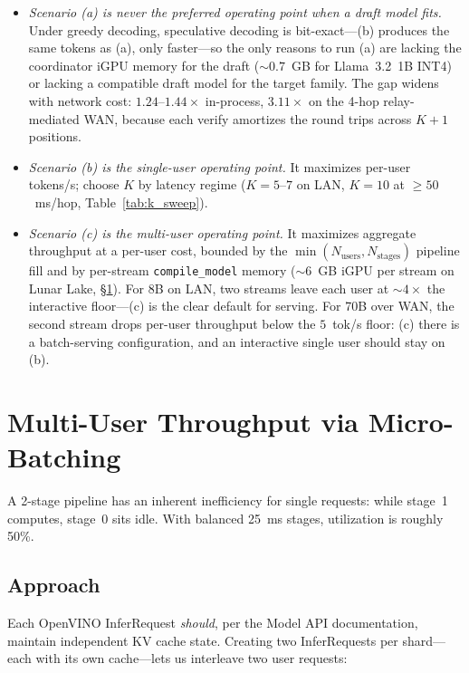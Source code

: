 \documentclass[11pt]{article}
\newcommand{\brk}{\discretionary{}{}{}}
\begin{document}
\begin{itemize}[leftmargin=*]
  \item \emph{Scenario (a) is never the preferred operating point when a draft model fits.} Under greedy decoding, speculative decoding is bit-exact---(b) produces the same tokens as (a), only faster---so the only reasons to run (a) are lacking the coordinator iGPU memory for the draft (${\sim}0.7$~GB for Llama~3.2~1B INT4) or lacking a compatible draft model for the target family. The gap widens with network cost: $1.24$--$1.44\times$ in-process, $3.11\times$ on the 4-hop relay-mediated WAN, because each verify amortizes the round trips across $K\!+\!1$ positions.
  \item \emph{Scenario (b) is the single-user operating point.} It maximizes per-user tokens/s; choose $K$ by latency regime ($K\!=\!5$--$7$ on LAN, $K\!=\!10$ at $\geq 50$~ms/hop, Table~\ref{tab:k_sweep}).
  \item \emph{Scenario (c) is the multi-user operating point.} It maximizes aggregate throughput at a per-user cost, bounded by the $\min(N_\text{users}, N_\text{stages})$ pipeline fill and by per-stream \texttt{compile\_\brk model} memory (${\sim}6$~GB iGPU per stream on Lunar Lake, \S\ref{sec:microbatch}). For 8B on LAN, two streams leave each user at ${\sim}4\times$ the interactive floor---(c) is the clear default for serving. For 70B over WAN, the second stream drops per-user throughput below the $5$~tok/s floor: (c) there is a batch-serving configuration, and an interactive single user should stay on (b).
\end{itemize}

\section{Multi-User Throughput via Micro-Batching}
\label{sec:microbatch}

A 2-stage pipeline has an inherent inefficiency for single requests: while stage~1 computes, stage~0 sits idle. With balanced 25~ms stages, utilization is roughly 50\%.

\subsection{Approach}

Each OpenVINO InferRequest \emph{should}, per the Model API documentation, maintain independent KV cache state. Creating two InferRequests per shard---each with its own cache---lets us interleave two user requests:
\end{document}

